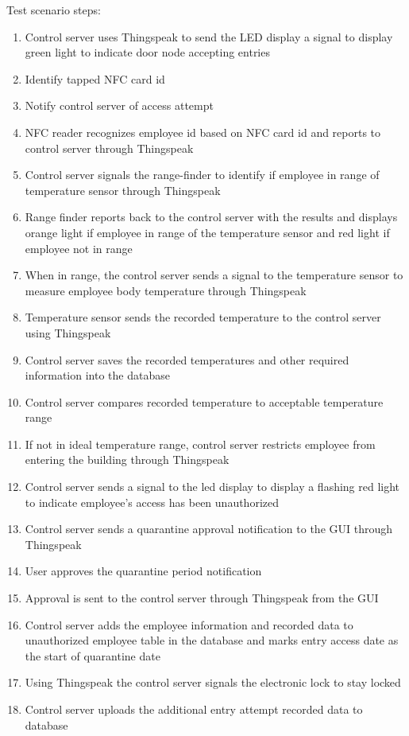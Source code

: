 \noindent
Test scenario steps:
\begin{enumerate}
    \item Control server uses Thingspeak to send the LED display a signal to
          display green light to indicate door node accepting entries
    \item Identify tapped NFC card id
    \item Notify control server of access attempt
    \item NFC reader recognizes employee id based on NFC card id and reports to
          control server through Thingspeak
    \item Control server signals the range-finder to identify if employee in
          range of temperature sensor through Thingspeak
    \item Range finder reports back to the control server with the results and
          displays orange light if employee in range of the temperature sensor
          and red light if employee not in range 
    \item When in range, the control server sends a signal to the temperature
          sensor to measure employee body temperature through Thingspeak
    \item Temperature sensor sends the recorded temperature to the control
          server using Thingspeak
    \item Control server saves the recorded temperatures and other required
          information into the database
    \item Control server compares recorded temperature to acceptable temperature
          range
    \item If not in ideal temperature range, control server restricts employee
          from entering the building through Thingspeak
    \item Control server sends a signal to the led display to display a flashing
          red light to indicate employee's access has been unauthorized
    \item Control server sends a quarantine approval notification to the GUI
          through Thingspeak
    \item User approves the quarantine period notification
    \item Approval is sent to the control server through Thingspeak from the GUI
    \item Control server adds the employee information and recorded data to
          unauthorized employee table in the database and marks entry access
          date as the start of quarantine date 
    \item Using Thingspeak the control server signals the electronic lock to
          stay locked 
    \item Control server uploads the additional entry attempt recorded data to
          database
\end{enumerate}

